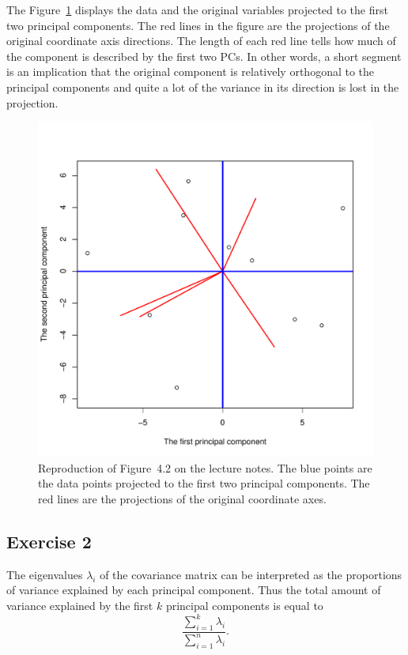 \documentclass{article}
\begin{document}
The Figure~\ref{fig:42} displays the data and the original variables projected to the first two principal components.
The red lines in the figure are the projections of the original coordinate axis directions.
The length of each red line tells how much of the component is described by the first two PCs.
In other words, a short segment is an implication that the original component is relatively orthogonal to the principal components and quite a lot of the variance in its direction is lost in the projection.

\begin{figure}\centering
	\includegraphics[scale=\sscale]{fig42}
	\caption{Reproduction of Figure~4.2 on the lecture notes.
	The blue points are the data points projected to the first two principal components.
The red lines are the projections of the original coordinate axes.}\label{fig:42}
\end{figure}

\subsection{Exercise 2}
The eigenvalues $\lambda_i$ of the covariance matrix can be interpreted as the proportions of variance explained by each principal component.
Thus the total amount of variance explained by the first $k$ principal components is equal to $$ \frac{\sum_{i=1}^k\lambda_i}{\sum_{i=1}^n\lambda_i}. $$
\end{document}
